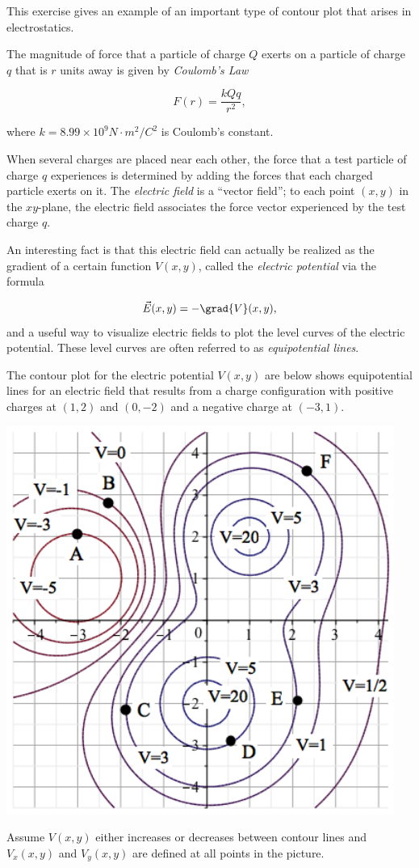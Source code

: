 \documentclass{ximera}
\author{Jim Talamo}
\begin{document}
\begin{exercise}

This exercise gives an example of an important type of contour plot that arises in electrostatics.

The magnitude of force that a particle of charge $Q$ exerts on a particle of charge $q$ that is $r$ units away is given by \emph{Coulomb's Law}

\[
F(r) = \frac{kQq}{r^2},
\] 

where $k =8.99 \times 10^9\unit{N}\cdot\unit{m}^2 /\unit{C}^2$ is Coulomb's constant.

When several charges are placed near each other, the force that a test particle of charge $q$ experiences is determined by adding the forces that each charged particle exerts on it.  The \emph{electric field} is a ``vector field''; to each point $(x,y)$ in the $xy$-plane, the electric field associates the force vector experienced by the test charge $q$.

An interesting fact is that this electric field can actually be realized as the gradient of a certain function $V(x,y)$, called the \emph{electric potential} via the formula

\[
\vec{E}(x,y)=-\grad{V}(x,y),
\]
and a useful way to visualize electric fields to plot the level curves of the electric potential.  These level curves are often referred to as \emph{equipotential lines}.

The contour plot for the electric potential $V(x,y)$ are below shows equipotential lines for an electric field that results from a charge configuration with positive charges at $(1,2)$ and $(0,-2)$ and a negative charge at $(-3,1)$.

\begin{image}
\includegraphics[width=5in]{contours3.png}
\end{image}
Assume $V(x,y)$ either increases or decreases between contour lines and $V_x(x,y)$ and $V_y(x,y)$ are defined at all points in the picture.


\end{exercise}
\end{document}
